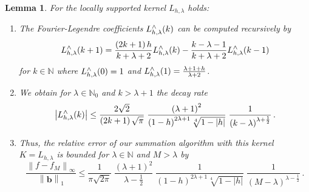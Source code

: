 \documentclass[11pt,a4paper,twoside,bibtotoc]{scrartcl}
\theoremstyle{plain}
\newtheorem{lemma}[theorem]{Lemma}
\theoremstyle{definition}
\theoremstyle{remark}
\newcommand{\N}{\ensuremath{\mathbb{N}}}
\newcommand{\NZ}{\ensuremath{\mathbb{N}_{0}}}
\newcommand{\fun}[2]{\ensuremath{#1{\hspace{-0.4ex}}\left(#2\right)}}
\numberwithin{equation}{section}
\numberwithin{table}{section}
\numberwithin{figure}{section}
\begin{document}
\begin{lemma}
  For the locally supported kernel $L_{h,\lambda}$ holds:
  \begin{enumerate}
  \item The Fourier-Legendre coefficients $\fun{L_{h,\lambda}^{\wedge}}{k}$ can be computed recursively by
    \[
    \fun{L_{h,\lambda}^{\wedge}}{k+1} = \frac{\left(2k+1\right) h}{k+\lambda+2}
    \fun{L_{h,\lambda}^{\wedge}}{k}   - \frac{k-\lambda-1}{k+\lambda+2}
    \fun{L_{h,\lambda}^{\wedge}}{k-1}
    \]
    for $k\in \N$ where $\fun{L_{h,\lambda}^{\wedge}}{0} = 1$ and
    $\fun{L_{h,\lambda}^{\wedge}}{1} = \frac{\lambda + 1 + h}{\lambda+2}$.
  \item We obtain for $\lambda \in \NZ$ and $k>\lambda+1$ the decay rate
    \[
    \left|\fun{L_{h,\lambda}^{\wedge}}{k}\right| \le
    \frac{2\sqrt{2}}{\left(2k+1\right)\sqrt{\pi}}\;
    \frac{\left(\lambda+1\right)^2}{\left(1-h\right)^{2\lambda+1}\sqrt[4]{1-|h|}}\;
    \frac{1}{\left(k-\lambda\right)^{\lambda+\frac{1}{2}}}\,. 
    \]
  \item Thus, the relative error of our summation algorithm with this kernel
  $K=L_{h,\lambda}$ is bounded for $\lambda \in \N$ and $M>\lambda$ by
  \begin{equation}
    \label{error:Lh}
    \frac{\left\|f - f_{M}\right\|_{\infty}}{\left\|\mathbf{b}\right\|_1} \le
    \frac{1}{\pi\sqrt{2\pi}}\;
    \frac{\left(\lambda+1\right)^2}{\lambda-\frac{1}{2}}\;
    \frac{1}{\left(1-h\right)^{2\lambda+1}\sqrt[4]{1-|h|}}\;
    \frac{1}{\left(M-\lambda\right)^{\lambda-\frac{1}{2}}}\,.
  \end{equation}
  \end{enumerate}
\end{lemma}
\end{document}
